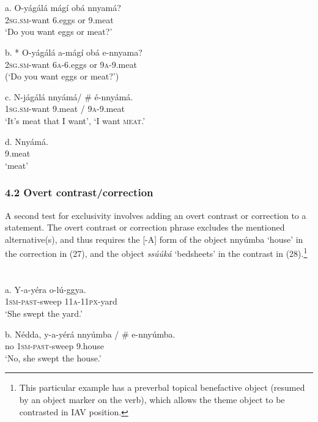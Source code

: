\documentclass[output=paper]{langsci/langscibook}
\begin{document}
\chapter[  ]{  }
\gll   a.  O-yágálá    mágí    obá  nnyamá?\\
         \textsc{2sg}.\textsc{sm}{}-want    6.eggs    or  9.meat \\
\glt     ‘Do you want eggs or meat?’
\z

\gll   b.  * O-yágálá    a-mágí  obá  e-nnyama?\\
         \textsc{2sg}.\textsc{sm}{}-want    \textsc{6a}{}-6.eggs  or  \textsc{9a}{}-9.meat\\
\glt     (‘Do you want eggs or meat?’)
\z

\gll   c.  N-jágálá    nnyámá/ \# é-nnyámá.\\
         \textsc{1sg}.\textsc{sm}{}-want    9.meat / \textsc{9a}{}-9.meat\\
\glt     ‘It’s meat that I want’, ‘I want \textsc{meat}.’
\z

\gll   d.  Nnyámá.\\
         9.meat\\
\glt     ‘meat’
\z

\subsection{ 4.2 Overt contrast/correction}

A second test for exclusivity involves adding an overt contrast or correction to a statement. The overt contrast or correction phrase excludes the mentioned alternative(s), and thus requires the [-A] form of the object nnyúmba ‘house’ in the correction in (27), and the object \textit{ssúúká} ‘bedsheets’ in the contrast in (28).\footnote{ This particular example has a preverbal topical benefactive object (resumed by an object marker on the verb), which allows the theme object to be contrasted in IAV position.}

\chapter{}
\gll   a.  Y-a-yéra    o-lú-ggya.\\
         \textsc{1sm}{}-\textsc{past}{}-sweep  \textsc{11a}{}-\textsc{11px}{}-yard\\
\glt     ‘She swept the yard.’
\z

\gll   b.  Nédda,  y-a-yérá    nnyúmba / \# e-nnyúmba.\\
         no    \textsc{1sm}{}-\textsc{past}{}-sweep  9.house\\
\glt     ‘No, she swept the house.’
\z
\end{document}
